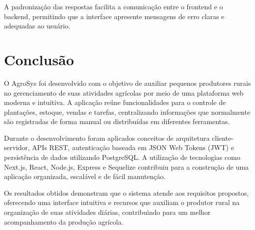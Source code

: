 \documentclass[12pt]{article}
\begin{document}
A padronização das respostas facilita a comunicação entre o frontend e o backend, permitindo que a interface apresente mensagens de erro claras e adequadas ao usuário.


\section{Conclusão}

O AgroSys foi desenvolvido com o objetivo de auxiliar pequenos produtores rurais no gerenciamento de suas atividades agrícolas por meio de uma plataforma web moderna e intuitiva. A aplicação reúne funcionalidades para o controle de plantações, estoque, vendas e tarefas, centralizando informações que normalmente são registradas de forma manual ou distribuídas em diferentes ferramentas.

Durante o desenvolvimento foram aplicados conceitos de arquitetura cliente-servidor, APIs REST, autenticação baseada em JSON Web Tokens (JWT) e persistência de dados utilizando PostgreSQL. A utilização de tecnologias como Next.js, React, Node.js, Express e Sequelize contribuiu para a construção de uma aplicação organizada, escalável e de fácil manutenção.

Os resultados obtidos demonstram que o sistema atende aos requisitos propostos, oferecendo uma interface intuitiva e recursos que auxiliam o produtor rural na organização de suas atividades diárias, contribuindo para um melhor acompanhamento da produção agrícola.


% 
% 
\end{document}

